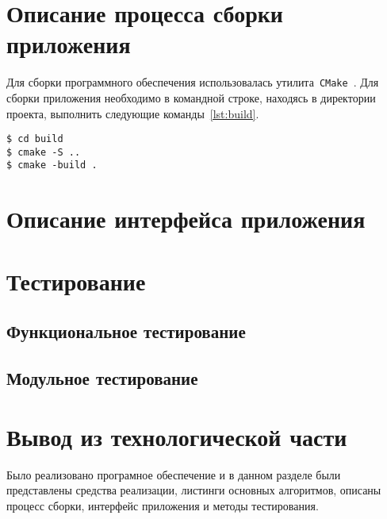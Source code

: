 \section{Описание процесса сборки приложения}
Для сборки программного обеспечения использовалась утилита~\texttt{CMake}~\cite{cmake}. Для сборки приложения необходимо в командной строке, находясь в директории проекта, выполнить следующие команды~\ref{lst:build}.

\begin{center}
	\captionsetup{justification=raggedright,singlelinecheck=off}
	\renewcommand{\lstlistingname}{Листинг}
	\begin{lstlisting}[label=lst:build, caption=Сборка программного обеспечения]
$ cd build
$ cmake -S ..
$ cmake -build .
	\end{lstlisting}
\end{center}
\clearpage

\section{Описание интерфейса приложения}

\clearpage
\section{Тестирование}

\subsection{Функциональное тестирование}

\subsection{Модульное тестирование}


\clearpage
\section*{Вывод из технологической части}
Было реализовано програмное обеспечение и в данном разделе были представлены средства реализации, листинги основных алгоритмов, описаны процесс сборки, интерфейс приложения и методы тестирования.
\clearpage

